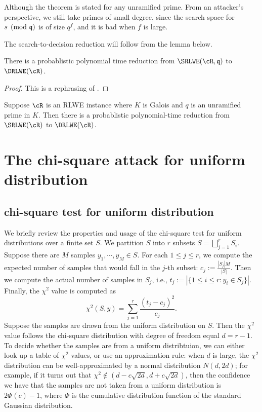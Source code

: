 \documentclass{amsart}
\begin{document}
\begin{remark}
Although the theorem is stated for any unramified prime. From an attacker's perspective, we still take primes of small degree, since the search space for $s \pmod{\mathfrak{q}}$ is of size $q^f$, and it is bad when $f$ is large.
\end{remark}

The search-to-decision reduction will follow from the lemma below.
\begin{Lemma}
There is a probablistic polynomial time reduction from $\SRLWE(\cR,\fq)$ to $\DRLWE(\cR)$.
\end{Lemma}

\begin{proof}
This is a rephrasing of \cite[Lemma 5.9 and Lemma 5.12 ]{lyubashevsky2013ideal}.
\end{proof}

\begin{Corollary}
Suppose $\cR$ is an RLWE instance where $K$ is Galois and $q$ is an unramified prime in $K$. Then there is a probablistic polynomial-time reduction from $\SRLWE(\cR)$ to $\DRLWE(\cR)$.
\end{Corollary}

\section{The chi-square attack for uniform distribution}
\label{sec: chi-square}
\subsection{chi-square test for uniform distribution}
We briefly review the properties and usage of the chi-square test for uniform distributions over a finite set $S$. We partition $S$ into $r$ subsets $S = \bigsqcup_{j=1}^r S_i$.
Suppose there are $M$ samples $y_1, \cdots, y_M \in S$.
For each $1 \leq j \leq r$, we compute the expected number of samples that would fall in the $j$-th subset: $c_j := \frac{|S_j|M}{|S|}$. Then we compute the actual number of samples in $S_j$, i.e., $t_j := |\{1 \leq i \leq r: y_i \in S_j\}|$. Finally, the $\chi^2$ value is computed as
\[
    \chi^2(S,y) = \sum_{j = 1}^r \frac{(t_j -c_j)^2}{c_j}.
\]
Suppose the samples are drawn from the uniform distribution on $S$. Then the $\chi^2$ value follows the chi-square distribution with degree of freedom equal $d = r-1$.
To decide whether the samples are from a uniform distribtuion, we can either look up a table of $\chi^2$ values, or use an approximation rule:  when $d$ is large, the $\chi^2$ distribution can be well-approximated by a normal distribution $N(d, 2d)$; for example, if it turns out that $\chi^2 \notin (d - c \sqrt{2d}, d+ c \sqrt{2d})$, then the confidence we have that the samples are not taken from a uniform distribution is $2\Phi(c) - 1$, where $\Phi$ is the cumulative distribution function of the standard Gaussian distribution.
\end{document}
